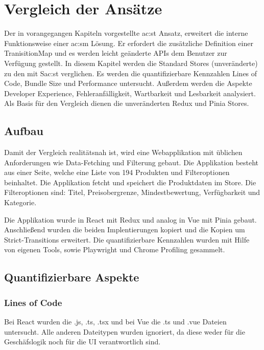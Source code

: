\chapter{Vergleich der Ansätze} \label{vergleich}

Der in vorangegangen Kapiteln vorgestellte \acrlong{ac:st} Ansatz, erweitert die interne Funktionsweise einer \acrlong{ac:sm} Lösung. Er erfordert die zusätzliche Definition einer TranisitionMap und es werden leicht geänderte APIs dem Benutzer zur Verfügung gestellt. In diesem Kapitel werden die Standard Stores (unveränderte) zu den mit S\acrlong{ac:st} verglichen. Es werden die quantifizierbare Kennzahlen Lines of Code, Bundle Size und Performance untersucht. Außerdem werden die Aspekte Developer Experience, Fehleranfälligkeit, Wartbarkeit und Lesbarkeit analysiert. Als Basis für den Vergleich dienen die unveränderten Redux und Pinia Stores.

\section{Aufbau}

Damit der Vergleich realitätsnah ist, wird eine Webapplikation mit üblichen Anforderungen wie Data-Fetching und Filterung gebaut. Die Applikation besteht aus einer Seite, welche eine Liste von 194 Produkten und Filteroptionen beinhaltet. Die Applikation fetcht und speichert die Produktdaten im Store. Die Filteroptionen sind: Titel, Preisobergrenze, Mindestbewertung, Verfügbarkeit und Kategorie.

Die Applikation wurde in React mit Redux und analog in Vue mit Pinia gebaut. Anschließend wurden die beiden Implentierungen kopiert und die Kopien um Strict-Transitions erweitert. Die quantifizierbare Kennzahlen wurden mit Hilfe von eigenen Tools, sowie Playwright und Chrome Profiling gesammelt.

\section{Quantifizierbare Aspekte}
\subsection{Lines of Code}

Bei React wurden die .js, .ts, .tsx und bei Vue die .ts und .vue Dateien untersucht. Alle anderen Dateitypen wurden ignoriert, da diese weder für die Geschäfslogik noch für die UI verantwortlich sind.

